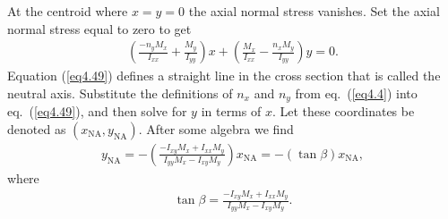 \documentclass{AeroStructure-ERJohnson}
\begin{document}
\noindent At the centroid where $x=y=0$ the axial normal stress vanishes. Set the axial normal stress equal to zero to get
\begin{align}\label{eq4.49}
\left(\frac{-n_{y} M_{x}}{I_{x x}}+\frac{M_{y}}{I_{y y}}\right) x+\left(\frac{M_{x}}{I_{x x}}-\frac{n_{x} M_{y}}{I_{y y}}\right) y=0.
\end{align}
Equation (\ref{eq4.49}) defines a straight line in the cross section that is called the neutral axis. Substitute the definitions of $n_{x}$ and $n_{y}$ from eq.~(\ref{eq4.4}) into eq.~(\ref{eq4.49}), and then solve for $y$ in terms of $x$. Let these coordinates be denoted as $\left(x_{\mathrm{NA}}, y_{\mathrm{NA}}\right)$. After some algebra we find
\begin{align}\label{eq4.50}
y_{\mathrm{NA}}=-\left(\frac{-I_{x y} M_{x}+I_{x x} M_{y}}{I_{y y} M_{x}-I_{x y} M_{y}}\right) x_{\mathrm{NA}}=-(\tan \beta) x_{\mathrm{NA}},
\end{align}
where
\begin{align}\label{eq4.51}
\tan \beta=\frac{-I_{x y} M_{x}+I_{x x} M_{y}}{I_{y y} M_{x}-I_{x y} M_{y}}.
\end{align}

\vspace*{-5pt}
\end{document}
